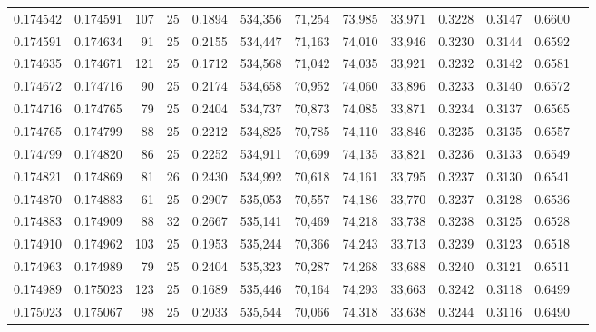 \begin{tabular}{rrrrrrrrrrrrr}
0.174542 & 0.174591 & 107 &  25 &                                     0.1894 & 534,356 &  71,254 &  73,985 &  33,971 & 0.3228 & 0.3147 & 0.6600 \\
0.174591 & 0.174634 &  91 &  25 &                                     0.2155 & 534,447 &  71,163 &  74,010 &  33,946 & 0.3230 & 0.3144 & 0.6592 \\
0.174635 & 0.174671 & 121 &  25 &                                     0.1712 & 534,568 &  71,042 &  74,035 &  33,921 & 0.3232 & 0.3142 & 0.6581 \\
0.174672 & 0.174716 &  90 &  25 &                                     0.2174 & 534,658 &  70,952 &  74,060 &  33,896 & 0.3233 & 0.3140 & 0.6572 \\
0.174716 & 0.174765 &  79 &  25 &                                     0.2404 & 534,737 &  70,873 &  74,085 &  33,871 & 0.3234 & 0.3137 & 0.6565 \\
0.174765 & 0.174799 &  88 &  25 &                                     0.2212 & 534,825 &  70,785 &  74,110 &  33,846 & 0.3235 & 0.3135 & 0.6557 \\
0.174799 & 0.174820 &  86 &  25 &                                     0.2252 & 534,911 &  70,699 &  74,135 &  33,821 & 0.3236 & 0.3133 & 0.6549 \\
0.174821 & 0.174869 &  81 &  26 &                                     0.2430 & 534,992 &  70,618 &  74,161 &  33,795 & 0.3237 & 0.3130 & 0.6541 \\
0.174870 & 0.174883 &  61 &  25 &                                     0.2907 & 535,053 &  70,557 &  74,186 &  33,770 & 0.3237 & 0.3128 & 0.6536 \\
0.174883 & 0.174909 &  88 &  32 &                                     0.2667 & 535,141 &  70,469 &  74,218 &  33,738 & 0.3238 & 0.3125 & 0.6528 \\
0.174910 & 0.174962 & 103 &  25 &                                     0.1953 & 535,244 &  70,366 &  74,243 &  33,713 & 0.3239 & 0.3123 & 0.6518 \\
0.174963 & 0.174989 &  79 &  25 &                                     0.2404 & 535,323 &  70,287 &  74,268 &  33,688 & 0.3240 & 0.3121 & 0.6511 \\
0.174989 & 0.175023 & 123 &  25 &                                     0.1689 & 535,446 &  70,164 &  74,293 &  33,663 & 0.3242 & 0.3118 & 0.6499 \\
0.175023 & 0.175067 &  98 &  25 &                                     0.2033 & 535,544 &  70,066 &  74,318 &  33,638 & 0.3244 & 0.3116 & 0.6490 \\

\end{tabular}
